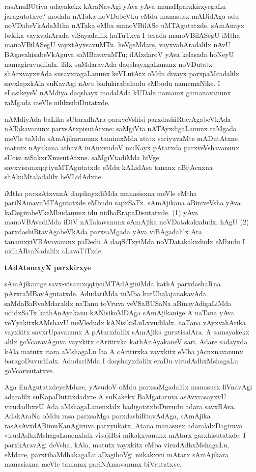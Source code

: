 rasAnuBUtiya udayakekx kAraNavAgi yAva yAva manaHparxkirxyegaLu jaragu\-tatxve? modalu nATaka noVDabeVku eMdu manasusx mADidAga adu noVDabeVkA\-daMtha nATaka eMba manoVBilASe uMTAgutatxde. sAmAnayx lwkika vayxvahArada viSayadalilx huTuTxva I terada manoVBilASegU iMtha manoVBilASegU vayxtAyxsa\-vuMTu. heVgeMdare, vayxvahAradalilx nAvU BAgavahisabeVkAguva saMBavavuMTu; ilAlxdaroV yAva kelasada hoNeyU namagiruvudilalx. ililx suMdaravAda daqshayxgaLanunx noVDutatx shArxvayxvAda susavxragaLanunx keVLutAtx oMdu divayx parxpaMcadalilx savxlapxkAla suKavAgi nAvu badukirabahudu eMbudu namemxNike. I eLasikeyeV nAMdiya daqshayx modalAda kUDale namamx gamanavanunx raMgada meVle nililxsibiDutatxde.

nAMdiyAda baLika sUtarxdhAra parxveVshisi parxdashiRtavAgabeVkAda nATakavanunx parxsAtxpisutAtxne; saMgiVta nATAyxdigaLanunx raMgada meVle taMdu sAmAjikaranunx tamimxMda atatx sariyuvaMte mADutAtxne matutx nAyakana athavA inAnxvudoV muKayx pAtarxda parxveVshavanunx sUcisi niSakxrXmisutAtxne. saMgiVtadiMda hiVge savxvisamxqqtiyuMTAgutatxde eMdu kALidAsa tananx aBijAcnxna shAkuMtaladalilx heVLidAdxne.

iMtha parxsAtxvanA daqshayxdiMda manasisxna meVle eMtha pariNAmavuMTAgutatxde eMbudu sapxSaTx. sAmAjikana aBiniveVsha yAva kaDegirabeVkeMbudanunx idu nidhaRrapaDisutatxde. (1) yAva manoVBAvadiMda iDiV nATakavanunx sAmAjika noVDatakakxdudx, hAgU (2) parxdashiRtavAgabeVkAda parxsaMgada yAva viBAgadalilx Ata tanamxyiVBAvavanunx paDedu A daqSiTxyiMda noVDatakakxdudx eMbudu I nidhARraNadalilx aLavaTiTxde.

\smallskip
\begin{center}
{\Large\bf tAdAtamxyX parxkirxye}
\end{center}

sAmAjikanige savx-visamxqqtiyuMTAdAginiMda kathA parxdashaRna pArxraMBavAgutatxde. AdudariMda tuMba kutUhalajanakavAda saMdaBaRvoMdaralilx naTanu toVruva veVSa\-BUSaNa aBinayAdigaLiMda udidxSaTx kathAnAyakanu kANisikoMDAga sAmAjikanige A naTana yAva veYyakitxkAMshavU meVledudx kANisikoLuLxvudilalx. naTana vAyxvahArika vayxkitx savxrUpavanunx A pAtarxdalilx sAmAjika gurutisalAra. A samayakekx alilx goVcaravAguva vayxkitx cAritirxka kathAnAyakaneV sari. Adare sadayxda kAla matutx itara aMshagaLu Ita A cAritirxka vayxkitx eMba jAcnxnavanunx baragoDuvudilalx. AdudariMda I daqshayxdalilx eraDu virudAdhxMshagaLu goVcarisutatxve.

Aga EnAgutatxdeyeMdare, yAvudoV oMdu parxsaMgadalilx manasusx liVnavAgi adaralilx suKapaDutitxdadxre A suKakekx BaMgataruva asAvxrasayxvU virudadhxvU Ada aMshagaLanenxlalx badigotitxbiDuvudu adara savxBAva. AdakAraNa oMdu rasa parxsaMga parxdashiRtavAdAga, sAmAjika rasAsAvxdABimuKanAgiruva parxyukatx, Atana manasusx adaralalxDagiruva virudAdhxMshagaLanenxlalx visajiRsi mikakxvanunx mAtarx garxhisutatxde. I parxkAravAgi deVsha, kAla, matutx vayxkitx eMba virudAdhxMshagaLu, eMdare, parxtibaMdhakagaLu aDagihoVgi mikakxvu mAtarx sAmAjikara manasisxna meVle tamamx pariNAmavanunx biVrutatxve.

